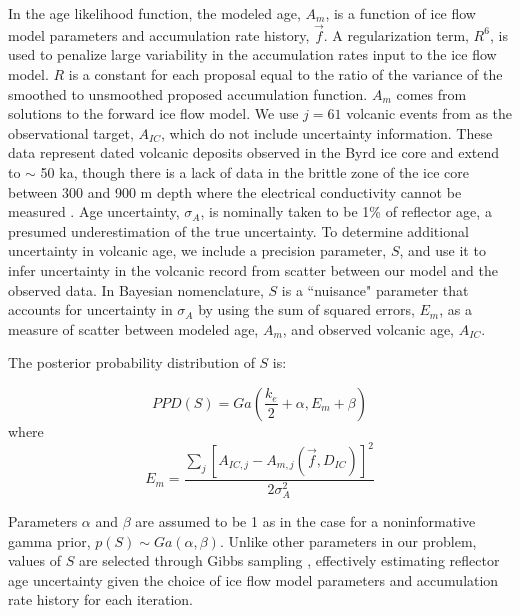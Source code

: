 

In the age likelihood function, the modeled age, $A_m$, is a function of ice flow model parameters and accumulation rate history, $\vec{f}$. A regularization term, $R^6$, is used to penalize large variability in the accumulation rates input to the ice flow model. $R$ is a constant for each proposal equal to the ratio of the variance of the smoothed to unsmoothed proposed accumulation function. $A_m$ comes from solutions to the forward ice flow model. We use $j=61$ volcanic events from \citet{hammer1997} as the observational target, $A_{IC}$, which do not include uncertainty information. These data represent dated volcanic deposits observed in the Byrd ice core and extend to $\sim$ 50 ka, though there is a lack of data in the brittle zone of the ice core between 300 and 900 m depth where the electrical conductivity cannot be measured \citep{hammer1997}. Age uncertainty, $\sigma_A$, is nominally taken to be 1\% of reflector age, a presumed underestimation of the true uncertainty. To determine additional uncertainty in volcanic age, we include a precision parameter, $S$, and use it to infer uncertainty in the volcanic record from scatter between our model and the observed data. In Bayesian nomenclature, $S$ is a ``nuisance" parameter that accounts for uncertainty in $\sigma_A$ by using the sum of squared errors, $E_m$, as a measure of scatter between modeled age, $A_m$, and observed volcanic age, $A_{IC}$. 

The posterior probability distribution of $S$ is:

\begin{equation}\label{eqn:S}
PPD(S) = Ga(\frac{k_e}{2}+\alpha, E_m+\beta)
\end{equation}
where 
\begin{equation}
 E_m= \frac{\sum_{j}[A_{IC,j} - A_{m,j}(\vec{f},D_{IC})]^2}{2\sigma_A^2} 
\end{equation}

Parameters $\alpha$ and $\beta$ are assumed to be 1 as in the case for a noninformative gamma prior, $p(S)\sim Ga(\alpha,\beta)$. Unlike other parameters in our problem, values of $S$ are selected through Gibbs sampling \citep{gelfand1992}, effectively estimating reflector age uncertainty given the choice of ice flow model parameters and accumulation rate history for each iteration.




